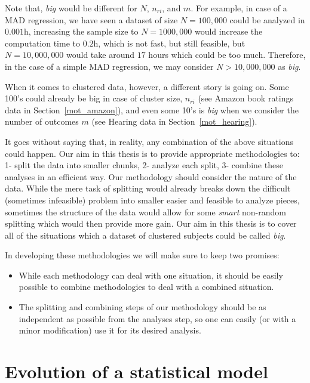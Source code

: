 \documentclass[11pt,a5paper,twoside]{book}
\begin{document}
Note that, \emph{big} would be different for $N$, $n_{ri}$, and $m$. For example, in case of a MAD regression, we have seen a dataset of size $N=100,000$ could be analyzed in $0.001$h, increasing the sample size to $N = 1000,000$ would increase the computation time to $0.2$h, which is not fast, but still feasible, but $N=10,000,000$ would take around $17$ hours which could be too much. Therefore, in the case of a simple MAD regression, we may consider $N>10,000,000$ as \emph{big}.

When it comes to clustered data, however, a different story is going on. Some 100's could already be big in case of cluster size, $n_{ri}$ (see Amazon book ratings data in Section~\ref{mot_amazon}), and even some 10's is \emph{big} when we consider the number of outcomes $m$ (see Hearing data in Section~\ref{mot_hearing}).

It goes without saying that, in reality, any combination of the above situations could happen. Our aim in this thesis is to provide appropriate methodologies to: 1- split the data into smaller chunks, 2- analyze each split, 3- combine these analyses in an efficient way. Our methodology should consider the nature of the data. While the mere task of splitting would already breaks down the difficult (sometimes infeasible) problem into smaller easier and feasible to analyze pieces, sometimes the structure of the data would allow for some \emph{smart} non-random splitting which would then provide more gain. Our aim in this thesis is to cover all of the situations which a dataset of clustered subjects could be called \emph{big}. 

In developing these methodologies we will make sure to keep two promises:

\begin{itemize}
\item While each methodology can deal with one situation, it should be easily possible to combine methodologies to deal with a combined situation.

\item The splitting and combining steps of our methodology should be as independent as possible from the analyses step, so one can easily (or with a minor modification) use it for its desired analysis.
 
\end{itemize}

\section{Evolution of a statistical model}
\end{document}
